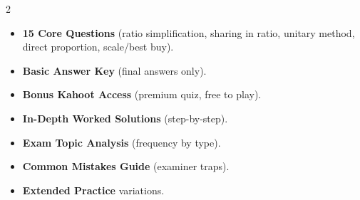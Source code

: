 \documentclass[11pt,a4paper]{article}
\newcommand{\FullReleaseDate}{April 30, 2026}
\begin{document}
\vspace{8pt}

\begin{multicols}{2}
  \begin{tcolorbox}[card, title=\sffamily\bfseries\textcolor{white}{\faHandPointDown\ TODAY (Simplified Version)}, colbacktitle=mainblue, boxed title style={sharp corners, boxrule=0pt}]
    \begin{itemize}[leftmargin=1.2em, itemsep=2pt]
      \item \small \textbf{15 Core Questions} (ratio simplification, sharing in ratio, unitary method, direct proportion, scale/best buy).
      \item \small \textbf{Basic Answer Key} (final answers only).
      \item \small \textbf{Bonus Kahoot Access} (premium quiz, free to play).
    \end{itemize}
  \end{tcolorbox}

  \columnbreak

  \begin{tcolorbox}[card, title=\sffamily\bfseries\textcolor{white}{\faRocket\ ON \FullReleaseDate\ (Full Upgrade)}, colbacktitle=mainblue, boxed title style={sharp corners, boxrule=0pt}]
    \begin{itemize}[leftmargin=1.2em, itemsep=2pt]
      \item \small \textbf{In-Depth Worked Solutions} (step-by-step).
      \item \small \textbf{Exam Topic Analysis} (frequency by type).
      \item \small \textbf{Common Mistakes Guide} (examiner traps).
      \item \small \textbf{Extended Practice} variations.
    \end{itemize}
  \end{tcolorbox}
\end{multicols}
\end{document}
